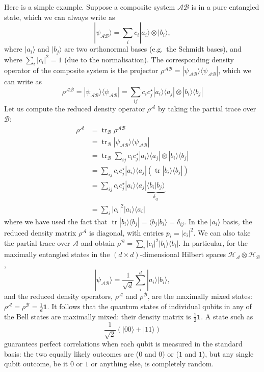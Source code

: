 \documentclass[fleqn]{article}
\begin{document}
Here is a simple example.
Suppose a composite system \(\mathcal{AB}\) is in a pure entangled state, which we can always write as
\[
  |\psi_{\mathcal{AB}}\rangle
  = \sum_{i} c_{i} |a_i\rangle\otimes|b_i\rangle,
\]
where \(|a_i\rangle\) and \(|b_j\rangle\) are two orthonormal bases (e.g.~the Schmidt bases), and where \(\sum_i |c_i|^2 = 1\) (due to the normalisation).
The corresponding density operator of the composite system is the projector \(\rho^{\mathcal{AB}}= |\psi_{\mathcal{AB}}\rangle\langle\psi_{\mathcal{AB}}|\), which we can write as
\[
  \rho^{\mathcal{AB}}
  = |\psi_{\mathcal{AB}}\rangle\langle\psi_{\mathcal{AB}}|
  = \sum_{ij} c_i c^\star_j |a_i\rangle\langle a_j| \otimes |b_i\rangle\langle b_j|
\]
Let us compute the reduced density operator \(\rho^{\mathcal{A}}\) by taking the partial trace over \(\mathcal{B}\):
\[
  \begin{aligned}
    \rho^\mathcal{A}
    &= \operatorname{tr}_{\mathcal{B}}\rho^{\mathcal{AB}}
  \\&= \operatorname{tr}_{\mathcal{B}} |\psi_{\mathcal{AB}}\rangle\langle\psi_{\mathcal{AB}}|
  \\&= \operatorname{tr}_{\mathcal{B}} \sum_{ij} c_i c^\star_j |a_i\rangle\langle a_j| \otimes |b_i\rangle\langle b_j|
  \\&= \sum_{ij} c_i c^\star_j |a_i\rangle\langle a_j|(\operatorname{tr}|b_i\rangle\langle b_j|)
  \\&= \sum_{ij} c_i c^\star_j |a_i\rangle\langle a_j| \underbrace{\langle b_i|b_j\rangle}_{\delta_{ij}}
  \\& = \sum_{i} |c_i|^2 |a_i\rangle\langle a_i|
  \end{aligned}
\]
where we have used the fact that \(\operatorname{tr}|b_i\rangle\langle b_j| = \langle b_j|b_i\rangle=\delta_{ij}\).
In the \(|a_i\rangle\) basis, the reduced density matrix \(\rho^{\mathcal{A}}\) is diagonal, with entries \(p_i=|c_i|^2\).
We can also take the partial trace over \(\mathcal{A}\) and obtain \(\rho^\mathcal{B} = \sum_{i} |c_i|^2 |b_i\rangle\langle b_i|\).
In particular, for the maximally entangled states in the \((d\times d)\)-dimensional Hilbert spaces \(\mathcal{H}_{\mathcal{A}}\otimes\mathcal{H}_{\mathcal{B}}\),
\[
  |\psi_{\mathcal{AB}}\rangle
  = \frac{1}{\sqrt{d}} \sum_{i}^d |a_i\rangle|b_i\rangle,
\]
and the reduced density operators, \(\rho^\mathcal{A}\) and \(\rho^\mathcal{B}\), are the maximally mixed states: \(\rho^\mathcal{A}=\rho^\mathcal{B}=\frac{1}{d}\mathbf{1}\).
It follows that the quantum states of individual qubits in any of the Bell states are maximally mixed: their density matrix is \(\frac12\mathbf{1}\).
A state such as
\[
  \frac{1}{\sqrt 2} \left( |00\rangle + |11\rangle \right)
\]
guarantees perfect correlations when each qubit is measured in the standard basis: the two equally likely outcomes are (\(0\) and \(0\)) or (\(1\) and \(1\)), but any single qubit outcome, be it \(0\) or \(1\) or anything else, is completely random.
\end{document}
